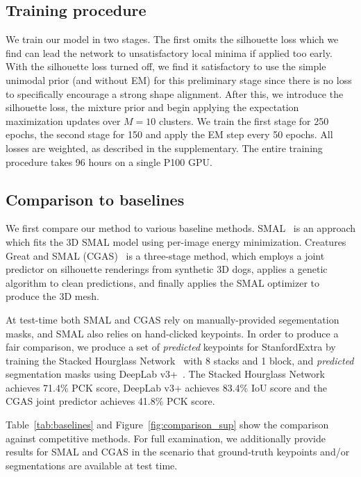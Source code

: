 \subsection{Training procedure}

We train our model in two stages. The first omits the silhouette loss which we find can lead the network to unsatisfactory local minima if applied too early. With the silhouette loss turned off, we find it satisfactory to use the simple unimodal prior (and without EM) for this preliminary stage since there is no loss to specifically encourage a strong shape alignment. After this, we introduce the silhouette loss, the mixture prior and begin applying the expectation maximization updates over $M=10$ clusters. We train the first stage for 250 epochs, the second stage for 150 and apply the EM step every 50 epochs. All losses are weighted, as described in the supplementary. The entire training procedure takes 96 hours on a single P100 GPU.

\subsection{Comparison to baselines}

We first compare our method to various baseline methods. SMAL~\cite{zuffi2017menagerie} is an approach which fits the 3D SMAL model using per-image energy minimization. Creatures Great and SMAL (CGAS)~\cite{biggs2018creatures} is a three-stage method, which employs a joint predictor on silhouette renderings from synthetic 3D dogs, applies a genetic algorithm to clean predictions, and finally applies the SMAL optimizer to produce the 3D mesh.

At test-time both SMAL and CGAS rely on manually-provided segementation masks, and SMAL also relies on hand-clicked keypoints. In order to produce a fair comparison, we produce a set of \emph{predicted} keypoints for StanfordExtra by training the Stacked Hourglass Network~\cite{newell2016stacked} with 8 stacks and 1 block, and \emph{predicted} segmentation masks using DeepLab v3+~\cite{deeplabv3plus}. The Stacked Hourglass Network achieves 71.4\% PCK score, DeepLab v3+ achieves 83.4\% IoU score and the CGAS joint predictor achieves 41.8\% PCK score. 


Table~\ref{tab:baselines} and Figure~\ref{fig:comparison_sup} show the comparison against competitive methods. For full examination, we additionally provide results for SMAL and CGAS in the scenario that ground-truth keypoints and/or segmentations are available at test time. 

